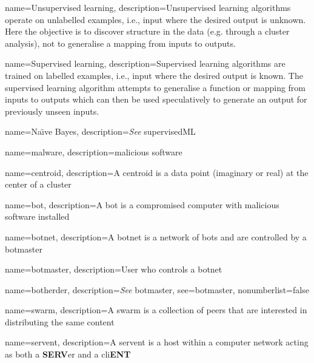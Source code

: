 {
  name={Unsupervised learning},
  description={Unsupervised learning algorithms operate on unlabelled examples, i.e., input where the desired output is unknown. Here the objective is to discover structure in the data (e.g. through a cluster analysis), not to generalise a mapping from inputs to outputs.}
}

{
  name={Supervised learning},
  description={Supervised learning algorithms are trained on labelled examples, i.e., input where the desired output is known. The supervised learning algorithm attempts to generalise a function or mapping from inputs to outputs which can then be used speculatively to generate an output for previously unseen inputs.}
}

{
  name={Na\"{\i}ve Bayes},
  description={\emph{See} \gls{supervisedML}}
}

{
  name=malware,
  description={malicious software}
}

{
  name=centroid,
  description={A centroid is a data point (imaginary or real) at the center of a cluster}
}

{
  name={bot},
  description={A bot is a compromised computer with malicious software installed}
}

{
  name={botnet},
  description={A botnet is a network of \glspl{bot} and are controlled by a \gls{botmaster}}
}

{
  name={botmaster},
  description={User who controls a \gls{botnet}}
}

{
  name={botherder},
  description={\emph{See} \gls{botmaster}},
  see={botmaster},
  nonumberlist=false
}

{
  name={swarm},
  description={A swarm is a collection of peers that are interested in distributing the same content}
} 

{
  name={servent},
  description={A servent is a host within a computer network acting as both a \textbf{SERV}er and a cli\textbf{ENT}}
}
